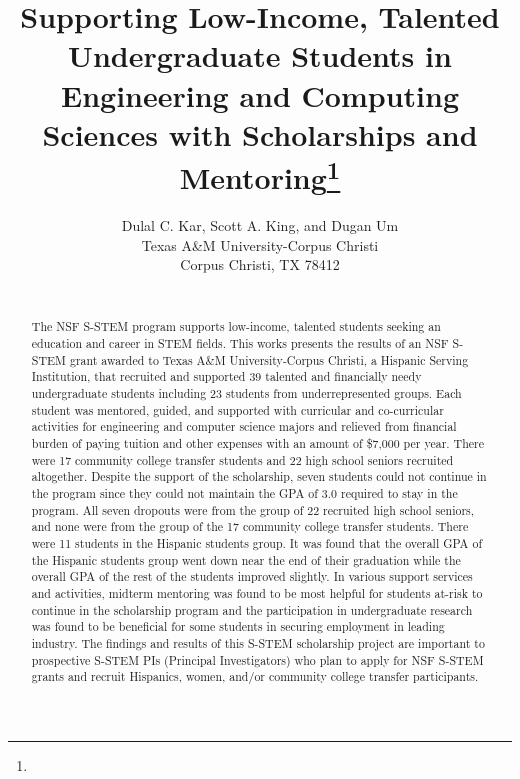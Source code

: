 \documentclass{article}
\title{Supporting Low-Income, Talented Undergraduate Students in Engineering and Computing Sciences with Scholarships and Mentoring\footnote{\protect}
}
\author{
Dulal C. Kar, Scott A. King, and Dugan Um\\
Texas A\&M University-Corpus Christi\\
Corpus Christi, TX 78412\\
\email{\{dulal.kar, scott.king, dugan.um\}@tamucc.edu}\\
}
\begin{document}
\maketitle

\begin{abstract}
The NSF S-STEM program supports low-income, talented students seeking an education and career in STEM fields. This works presents the results of an NSF S-STEM grant awarded to Texas A\&M University-Corpus Christi, a Hispanic Serving Institution, that recruited and supported 39 talented and financially needy undergraduate students including 23 students from underrepresented groups. Each student was mentored, guided, and supported with curricular and co-curricular activities for engineering and computer science majors and relieved from financial burden of paying tuition and other expenses with an amount of \$7,000 per year.  There were 17 community college transfer students and 22 high school seniors recruited altogether. Despite the support of the scholarship, seven students could not continue in the program since they could not maintain the GPA of 3.0 required to stay in the program. All seven dropouts were from the group of 22 recruited high school seniors, and none were from the group of the 17 community college transfer students. There were 11 students in the Hispanic students group. It was found that the overall GPA of the Hispanic students group went down near the end of their graduation while the overall GPA of the rest of the students improved slightly. In various support services and activities, midterm mentoring was found to be most helpful for students at-risk to continue in the scholarship program and the participation in undergraduate research was found to be beneficial for some students in securing employment in leading industry. The findings and results of this S-STEM scholarship project are important to prospective S-STEM PIs (Principal Investigators) who plan to apply for NSF S-STEM grants and recruit Hispanics, women, and/or community college transfer participants.
\end{abstract}
\end{document}
